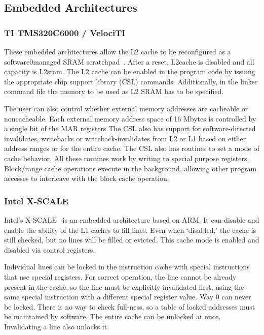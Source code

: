 \subsection{Embedded Architectures}
\subsubsection{TI TMS320C6000 / VelociTI}
These embedded architectures allow the L2 cache to be reconfigured as a software0managed SRAM scratchpad~\cite{TMS320C6000}.
After a reset, L2cache is disabled and all capacity is L2sram.
The L2 cache can be enabled in the program code by issuing the appropriate chip support library (CSL) commands.
Additionally, in the linker command file the memory to be used as L2 SRAM has to be specified.

The user can also control whether external memory addresses are cacheable or noncacheable.
Each external memory address space of 16 Mbytes is controlled by a single bit of the MAR registers
The CSL also has support for software-directed invalidates, writebacks or writeback-invalidates from L2 or L1
based on either address ranges or for the entire cache.
The CSL also has routines to set a mode of cache behavior.
All these routines work by writing to special purpose registers.
Block/range cache operations execute in the background, allowing other
program accesses to interleave with the block cache operation.

\subsubsection{Intel X-SCALE}

Intel's X-SCALE~\cite{intel-xscale} is an embedded architecture based on ARM.
It can disable and enable the ability of the L1 caches to fill lines.
Even when `disabled,' the cache is still checked, but no lines will be filled or evicted. 
This cache mode is enabled and disabled via control registers.

Individual lines can be locked in the instruction cache with special instructions that use special registers.
For correct operation, the line cannot be already present in the cache, so the line must be explicitly invalidated first, using the same special instruction with a different special register value. Way 0 can never be locked. There is no way to check full-ness, so a table of locked addresses must be maintained by software. The entire cache can be unlocked at once. Invalidating a line also unlocks it.

